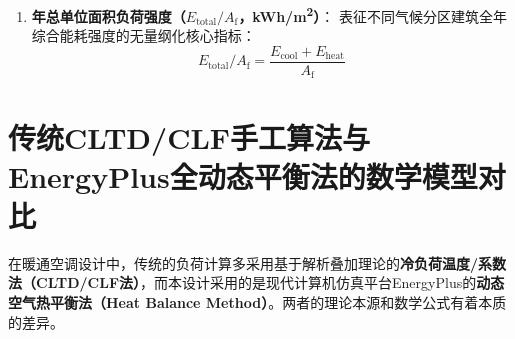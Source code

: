 \documentclass[11pt,a4paper]{article}
\begin{document}
\begin{enumerate}
    \item \textbf{年总单位面积负荷强度（$E_{\mathrm{total}}/A_{\mathrm{f}}$，\si{kWh/m^2}）}：
    表征不同气候分区建筑全年综合能耗强度的无量纲化核心指标：
    \begin{equation}
        E_{\mathrm{total}}/A_{\mathrm{f}} = \frac{E_{\mathrm{cool}} + E_{\mathrm{heat}}}{A_{\mathrm{f}}}
    \end{equation}
\end{enumerate}

\section{传统CLTD/CLF手工算法与EnergyPlus全动态平衡法的数学模型对比}

在暖通空调设计中，传统的负荷计算多采用基于解析叠加理论的\textbf{冷负荷温度/系数法（CLTD/CLF法）}，而本设计采用的是现代计算机仿真平台EnergyPlus的\textbf{动态空气热平衡法（Heat Balance Method）}。两者的理论本源和数学公式有着本质的差异。
\end{document}
